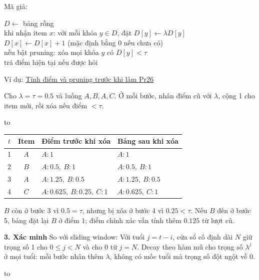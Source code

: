 \documentclass[10pt,a4paper,twocolumn]{article}
\makeatletter
\newcommand{\key}[1]{#1:\enspace}
\newcommand{\blocklabel}[1]{\par\noindent#1\par\nobreak}
\newcommand{\qlink}[2]{\hyperref[question:#1]{#2}}
\newenvironment{example}[2]{%
  \par\addvspace{6pt}\noindent
  \raggedright
  \blocklabel{Ví dụ: \qlink{#1}{#2}}%
}{\par\addvspace{4pt}}
\newenvironment{examtable}[1]{%
  \par\addvspace{2pt}\noindent\hbox to \linewidth\bgroup\hfil
  \setlength{\tabcolsep}{4pt}%
  \renewcommand{\arraystretch}{1.12}\begin{tabular}{#1}%
}{\end{tabular}\hfil\egroup\par\addvspace{2pt}}
\newenvironment{diagram}{%
  \par\addvspace{3pt}\noindent\hbox to \linewidth\bgroup\hfil
}{\hfil\egroup\par\addvspace{3pt}}
\newcommand{\unitheading}[2]{%
  \par\addvspace{1pt}\noindent\textbf{#1. #2}\enspace}
\newcommand{\unitverification}{\unitheading{3}{Xác minh}}
\newenvironment{algpseudo}{%
  \par\addvspace{2pt}\noindent
  \setlength{\parskip}{0pt}%
  Mã giả:\par\nobreak
  \begin{list}{}{\setlength{\leftmargin}{1em}\setlength{\topsep}{0pt}%
    \setlength{\partopsep}{0pt}\setlength{\parsep}{0pt}%
    \@beginparpenalty=10000\relax}%
  \item\relax
}{\end{list}\par\addvspace{3pt}}
\makeatother
\begin{document}
\begin{algpseudo}
$D\gets$ bảng rỗng\\
khi nhận item $x$: với mỗi khóa $y\in D$, đặt $D[y]\gets\lambda D[y]$\\
\quad $D[x]\gets D[x]+1$ (mặc định bằng 0 nếu chưa có)\\
\quad nếu bật pruning: xóa mọi khóa $y$ có $D[y]<\tau$\\
\quad trả điểm hiện tại nếu được hỏi
\end{algpseudo}

\begin{example}{Pr26}{Tính điểm và pruning trước khi làm Pr26}
Cho $\lambda=\tau=0.5$ và luồng $A,B,A,C$. Ở mỗi bước, nhân điểm cũ với $\lambda$, cộng 1 cho item mới, rồi xóa nếu điểm $<\tau$.
\begin{examtable}{@{}ccll@{}}
\toprule
$t$ & Item & Điểm trước khi xóa & Bảng sau khi xóa\\
\midrule
1 & $A$ & $A{:}1$ & $A{:}1$\\
2 & $B$ & $A{:}0.5,\ B{:}1$ & $A{:}0.5,\ B{:}1$\\
3 & $A$ & $A{:}1.25,\ B{:}0.5$ & $A{:}1.25,\ B{:}0.5$\\
4 & $C$ & $A{:}0.625,\ B{:}0.25,\ C{:}1$ & $A{:}0.625,\ C{:}1$\\
\bottomrule
\end{examtable}
$B$ còn ở bước 3 vì $0.5=\tau$, nhưng bị xóa ở bước 4 vì $0.25<\tau$. Nếu $B$ đến ở bước 5, bảng đặt lại $B$ ở điểm 1; điểm chính xác vẫn tính thêm $0.125$ từ lượt cũ.
\end{example}

\unitverification
\key{So với sliding window} Với tuổi $j=t-i$, cửa sổ cố định dài $N$ giữ trọng số 1 cho $0\le j<N$ và cho 0 từ $j=N$. Decay theo hàm mũ cho trọng số $\lambda^j$ ở mọi tuổi: mỗi bước nhân thêm $\lambda$, không có mốc tuổi mà trọng số đột ngột về 0.
\begin{diagram}
\end{diagram}
\end{document}
